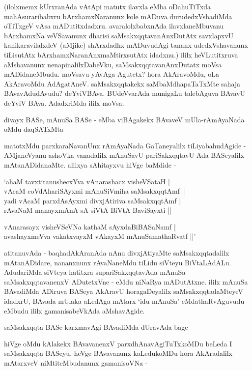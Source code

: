 (ilolxmemx kUrxranAda vAtApi matutx ilavxla eMba oDahuTiTxda mahAsuraribabxru bArxhamxNaranunx kole mADuva durudedxVshadiMda oTiTxgeV vAsa mADutitxdadxru. avaralolxbabxnAda ilavxlaneMbuvanu bArxhamxNa veVSavanunx dharisi saMsakxqqtavanAnxDutAtx savxlapxvU kanikaravilalxdeV (aMjike) shArxdadhx mADuvudAgi tananx udedxVshavanunx tiLisutAtx bArxhamxNaranAnxmaMtirxsutAtx idadxnu.) ililx heVLutitxruva aMshavanunx nenapinalilxDabeVku, saMsakxqqtavanAnxDutatx moVsa mADidaneMbudu. moVsavu yAvAga Agutetx? hora AkAravoMdu, oLa AkAravoMdu AdAgatAneV. saMsakxqqtakekx saMbaMdhapaTaTxMte sahaja BAvavAdudAvudu? deYviVBAva. BUdeVvarAda munigaLu talebAguva BAvavU deYviV BAva. AdadxriMda ililx moVsa.

divayx BASe, mAnuSa BASe - eMba viBAgakekx BAvaveV mUla-rAmAyaNada oMdu daqSATxMta

matotxMdu parxkaraNavanUnx rAmAyaNada GaTaneyalilx tiLiyabahudAgide - AMjaneVyanu ashoVka vanadalilx mAnuSavU pariSakxqqtavU Ada BASeyalilx mAtanADidanaMte. alilxya sAhitayxvu hiVge baMdide - 

\begin{shloka}
`ahaM tavxtitanushecxYva vAnarashacx visheVSataH |\\
vAcaM coVdAhariSAyxmi mAnuSiVmiha saMsakxqqtAmf ||\\

yadi vAcaM parxdAsAyxmi divxjAtiriva saMsakxqqtAmf |\\
rAvaNaM manayxmAnA sA siVtA BiVtA BaviSayxti ||

vAnarasayx visheVSeVNa kathaM sAyxdaBiBASaNamf |\\
avashayxmeVva vakatxvayxM vAkayxM mAnuSamathaRvatf ||'
\end{shloka}

atitanuvAda - baqhadAkAranAda nAnu divxjAtiyaMte saMsakxqqtadalilx mAtanADidare, nananxnunx rAvaNaneMdu tiLidu siVteyu BiVtaLAdALu. AdudariMda siVteya hatitxra supariSakxqqtavAda mAnuSa saMsakxqqtavanenxV ADutetxVne - eMdu niNaRya mADutAtxne. ililx mAnuSa BAvadiMda ADiruva BASeya AkAravU horagaDeyalilx saMsakxqqtadaMteyeV idadxrU, BAvada mUlaka aLedAga mAtarx `idu mAnuSa' eMdathaRvAguvudu eMbudu ililx gamanisabeVkAda aMshavAgide.

saMsakxqqta BASe karxmavAgi BAvadiMda dUravAda bage

hiVge oMdu kAlakekx BAvavanenxV parxdhAnavAgiTuTxkoMDu beLeda I saMsakxqqta BASeyu, heVge BAvavanunx kaLedukoMDu hora AkAradalilx mAtarxveV niMtiteMbudanunx gamanisoVNa - 

